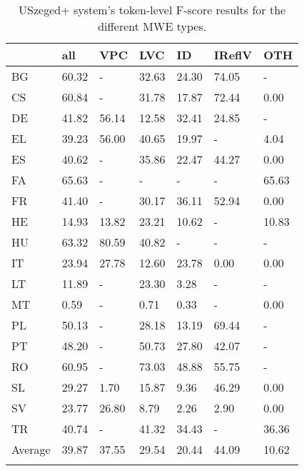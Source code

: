 \documentclass[output=paper,
modfonts,
]{langscibook}
\begin{document}
\begin{table}
\centering
\caption{USzeged+ system's token-level F-score results for the different MWE types.}
\label{tokenlevel}
\begin{tabular}{lllllll}
  \lsptoprule
  & all   & VPC    & LVC    & ID     & IReflV & OTH    \\
 \midrule
BG  & 60.32 &  -       & 32.63 & 24.30 & 74.05 &  -     \\
CS  & 60.84 &  -       & 31.78 & 17.87 & 72.44 & 0.00\\
DE  & 41.82 & 56.14 & 12.58 & 32.41 & 24.85 &  -     \\
EL  & 39.23 & 56.00 & 40.65 & 19.97 &  -       & 4.04\\
ES  & 40.62 &  -       & 35.86 & 22.47 & 44.27 & 0.00\\
FA  & 65.63 &  -       &  -       &  -       &  -       & 65.63\\
FR  & 41.40 &  -       & 30.17 & 36.11 & 52.94 & 0.00\\
HE  & 14.93 & 13.82 & 23.21 & 10.62 &  -       & 10.83\\
HU  & 63.32 & 80.59 & 40.82 &  -       &  -       &  -     \\
IT  & 23.94 & 27.78 & 12.60 & 23.78 & 0.00 & 0.00\\
LT  & 11.89 &  -       & 23.30 & 3.28 &  -       &  -     \\
MT  & 0.59 &  -       & 0.71 & 0.33 &  -       & 0.00\\
PL  & 50.13 &  -       & 28.18 & 13.19 & 69.44 &  -     \\
PT  & 48.20 &  -       & 50.73 & 27.80 & 42.07 &  -     \\
RO  & 60.95 &  -       & 73.03 & 48.88 & 55.75 &  -     \\
SL  & 29.27 & 1.70 & 15.87 & 9.36 & 46.29 & 0.00\\
SV  & 23.77 & 26.80 & 8.79 & 2.26 & 2.90 & 0.00\\
TR  & 40.74 &  -       & 41.32 & 34.43 &  -       & 36.36\\
\midrule
Average  & 39.87 & 37.55 & 29.54 & 20.44 & 44.09 & 10.62\\



  \lspbottomrule
\end{tabular}
\end{table}
\end{document}
